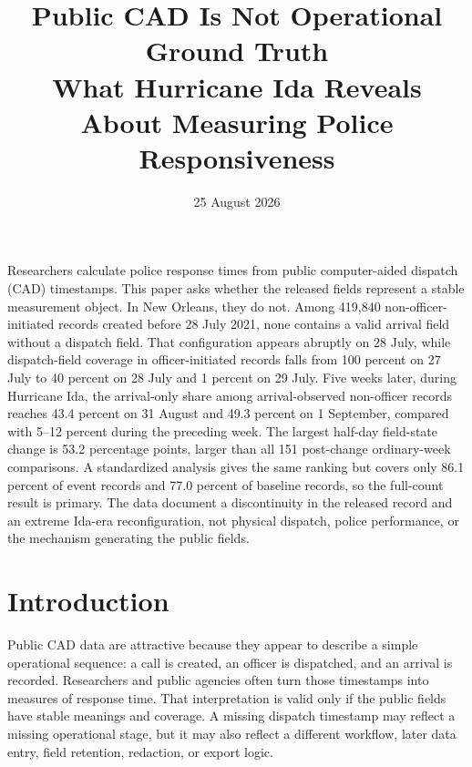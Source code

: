 \documentclass[11pt]{article}
\title{\vspace{-1.7em}\textbf{Public CAD Is Not Operational Ground Truth}\\[0.35em]
\large What Hurricane Ida Reveals About Measuring Police Responsiveness}
\author{}
\date{25 August 2026}
\begin{document}
\maketitle
\thispagestyle{plain}
\vspace{-1.3em}

\begin{plainbox}[title=Abstract]
Researchers calculate police response times from public computer-aided dispatch (CAD) timestamps. This paper asks whether the released fields represent a stable measurement object. In New Orleans, they do not. Among 419,840 non-officer-initiated records created before 28 July 2021, none contains a valid arrival field without a dispatch field. That configuration appears abruptly on 28 July, while dispatch-field coverage in officer-initiated records falls from 100 percent on 27 July to 40 percent on 28 July and 1 percent on 29 July. Five weeks later, during Hurricane Ida, the arrival-only share among arrival-observed non-officer records reaches 43.4 percent on 31 August and 49.3 percent on 1 September, compared with 5--12 percent during the preceding week. The largest half-day field-state change is 53.2 percentage points, larger than all 151 post-change ordinary-week comparisons. A standardized analysis gives the same ranking but covers only 86.1 percent of event records and 77.0 percent of baseline records, so the full-count result is primary. The data document a discontinuity in the released record and an extreme Ida-era reconfiguration, not physical dispatch, police performance, or the mechanism generating the public fields.
\end{plainbox}


\section{Introduction}

Public CAD data are attractive because they appear to describe a simple operational sequence: a call is created, an officer is dispatched, and an arrival is recorded. Researchers and public agencies often turn those timestamps into measures of response time. That interpretation is valid only if the public fields have stable meanings and coverage. A missing dispatch timestamp may reflect a missing operational stage, but it may also reflect a different workflow, later data entry, field retention, redaction, or export logic.
\end{document}
